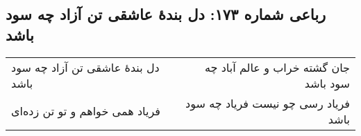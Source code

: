 \begin{center}
\section*{رباعی شماره ۱۷۳: دل بندهٔ عاشقی تن آزاد چه سود باشد}
\label{sec:sh173}
\begin{longtable}{l p{0.5cm} r}
دل بندهٔ عاشقی تن آزاد چه سود باشد
&&
جان گشته خراب و عالم آباد چه سود باشد
\\
فریاد همی خواهم و تو تن زده‌ای
&&
فریاد رسی چو نیست فریاد چه سود باشد
\\
\end{longtable}
\end{center}
